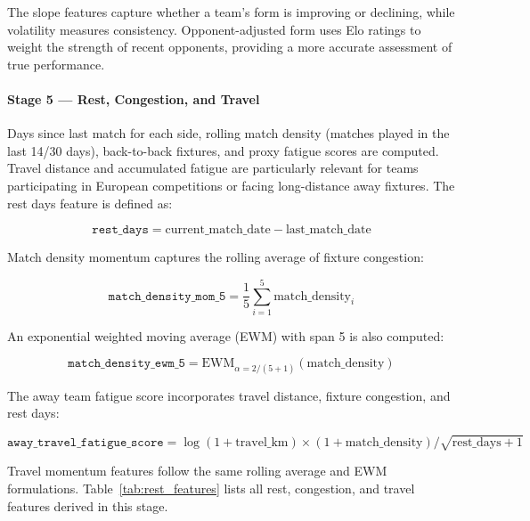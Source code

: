 \documentclass[pdflatex,sn-mathphys-num]{sn-jnl}
\theoremstyle{thmstyleone}
\theoremstyle{thmstyletwo}
\theoremstyle{thmstylethree}
\begin{document}
The slope features capture whether a team's form is improving or declining, while volatility measures consistency. Opponent-adjusted form uses Elo ratings to weight the strength of recent opponents, providing a more accurate assessment of true performance.

\paragraph{Stage 5 --- Rest, Congestion, and Travel}\label{subsec:rest}

Days since last match for each side, rolling match density (matches
played in the last 14/30 days), back-to-back fixtures, and proxy
fatigue scores are computed. Travel distance and accumulated fatigue
are particularly relevant for teams participating in European
competitions or facing long-distance away fixtures. The rest days feature is defined as:

\begin{equation}
\texttt{rest\_days} = \text{current\_match\_date} - \text{last\_match\_date}
\end{equation}

Match density momentum captures the rolling average of fixture congestion:

\begin{equation}
\texttt{match\_density\_mom\_5} = \frac{1}{5} \sum_{i=1}^{5} \text{match\_density}_i
\end{equation}

An exponential weighted moving average (EWM) with span 5 is also computed:

\begin{equation}
\texttt{match\_density\_ewm\_5} = \text{EWM}_{\alpha=2/(5+1)}(\text{match\_density})
\end{equation}

The away team fatigue score incorporates travel distance, fixture congestion,
and rest days:

\begin{equation}
\texttt{away\_travel\_fatigue\_score} = \log(1 + \text{travel\_km}) \times
\left(1 + \text{match\_density}\right) / \sqrt{\text{rest\_days} + 1}
\end{equation}

Travel momentum features follow the same rolling average and EWM formulations.
Table~\ref{tab:rest_features} lists all rest, congestion, and travel features
derived in this stage.
\end{document}

